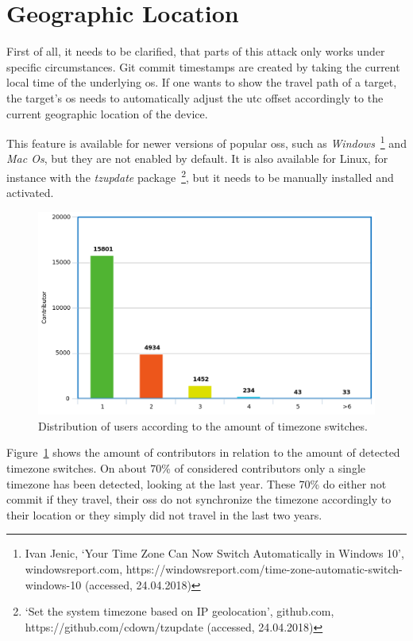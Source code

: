 \section{Geographic Location}

First of all, it needs to be clarified, that parts of this attack only works under specific circumstances.
Git commit timestamps are created by taking the current local time of the underlying \ac{os}.
If one wants to show the travel path of a target, the target's \ac{os} needs to automatically adjust the \ac{utc} offset accordingly to the current geographic location of the device.

This feature is available for newer versions of popular \acp{os}, such as \emph{Windows}~\footnote{Ivan Jenic, `Your Time Zone Can Now Switch Automatically in Windows 10', windowsreport.com, https://windowsreport.com/time-zone-automatic-switch-windows-10 (accessed, 24.04.2018)}
and \emph{Mac Os}, but they are not enabled by default.
It is also available for Linux, for instance with the \emph{tzupdate} package~\footnote{`Set the system timezone based on IP geolocation', github.com, https://github.com/cdown/tzupdate (accessed, 24.04.2018)}, but it needs to be manually installed and activated.

\begin{figure}[H]
    \includegraphics[scale=0.40]{./graphs/analysis/timezone-user-distribution}
    \centering
    \caption{Distribution of users according to the amount of timezone switches.}\label{fig:timezone-distribution}
\end{figure}

Figure~\ref{fig:timezone-distribution} shows the amount of contributors in relation to the amount of detected timezone switches.
On about 70\% of considered contributors only a single timezone has been detected, looking at the last year.
These 70\% do either not commit if they travel, their \acp{os} do not synchronize the timezone accordingly to their location or they simply did not travel in the last two years.

